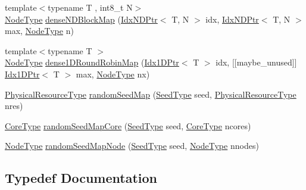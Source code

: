 \begin{DoxyCompactItemize}
\item 
{\footnotesize template$<$typename T , int8\+\_\+t N$>$ }\\\hyperlink{namespacevt_a866da9d0efc19c0a1ce79e9e492f47e2}{Node\+Type} \hyperlink{namespacevt_1_1mapping_a8e5581179e571387304de4b1d19640e7}{dense\+N\+D\+Block\+Map} (\hyperlink{namespacevt_1_1mapping_ab77f5302cd346d499e48a8c796043746}{Idx\+N\+D\+Ptr}$<$ T, N $>$ idx, \hyperlink{namespacevt_1_1mapping_ab77f5302cd346d499e48a8c796043746}{Idx\+N\+D\+Ptr}$<$ T, N $>$ max, \hyperlink{namespacevt_a866da9d0efc19c0a1ce79e9e492f47e2}{Node\+Type} n)
\item 
{\footnotesize template$<$typename T $>$ }\\\hyperlink{namespacevt_a866da9d0efc19c0a1ce79e9e492f47e2}{Node\+Type} \hyperlink{namespacevt_1_1mapping_a23ab17dfed32328ca92d270f1d13d090}{dense1\+D\+Round\+Robin\+Map} (\hyperlink{namespacevt_1_1mapping_a8b576cf2f31069778e4951f64bccafd8}{Idx1\+D\+Ptr}$<$ T $>$ idx, \mbox{[}\mbox{[}maybe\+\_\+unused\mbox{]}\mbox{]} \hyperlink{namespacevt_1_1mapping_a8b576cf2f31069778e4951f64bccafd8}{Idx1\+D\+Ptr}$<$ T $>$ max, \hyperlink{namespacevt_a866da9d0efc19c0a1ce79e9e492f47e2}{Node\+Type} nx)
\item 
\hyperlink{namespacevt_a2dc36fcada816dc6d11774d650328ee9}{Physical\+Resource\+Type} \hyperlink{namespacevt_1_1mapping_ab517203040d5d053a2293de5ea58bcf1}{random\+Seed\+Map} (\hyperlink{namespacevt_ae2e13198bdef4d5b8e603d6c1c7f0969}{Seed\+Type} seed, \hyperlink{namespacevt_a2dc36fcada816dc6d11774d650328ee9}{Physical\+Resource\+Type} nres)
\item 
\hyperlink{namespacevt_a74b11b22c02feaabab8591acc87c7c52}{Core\+Type} \hyperlink{namespacevt_1_1mapping_a35fdd9ccfcee759a8c0ba29b5c61d2a5}{random\+Seed\+Map\+Core} (\hyperlink{namespacevt_ae2e13198bdef4d5b8e603d6c1c7f0969}{Seed\+Type} seed, \hyperlink{namespacevt_a74b11b22c02feaabab8591acc87c7c52}{Core\+Type} ncores)
\item 
\hyperlink{namespacevt_a866da9d0efc19c0a1ce79e9e492f47e2}{Node\+Type} \hyperlink{namespacevt_1_1mapping_accca64daff113b58cd733710ab4e0854}{random\+Seed\+Map\+Node} (\hyperlink{namespacevt_ae2e13198bdef4d5b8e603d6c1c7f0969}{Seed\+Type} seed, \hyperlink{namespacevt_a866da9d0efc19c0a1ce79e9e492f47e2}{Node\+Type} nnodes)
\end{DoxyCompactItemize}


\subsection{Typedef Documentation}
\mbox{\label{namespacevt_1_1mapping_a748d5efb71ca5878288d5809f57d7254}} 
